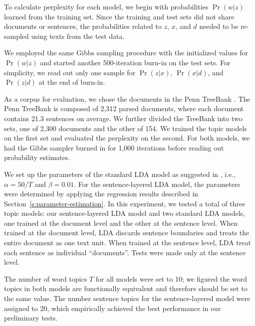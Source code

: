 To calculate perplexity for each model, we begin with probabilities $\Pr(w|z)$
learned from the training set.  Since the training and test sets did not
share documents or sentences, the probabilities related to $z$, $x$,
and $d$ needed to be re-sampled using texts from the test data.  

We employed the same Gibbs sampling procedure with the initialized
values for $\Pr(w|z)$ and started another 500-iteration burn-in on the test
sets.  For simplicity, we read out only one sample for $\Pr(z|x)$,
$\Pr(x|d)$, and $\Pr(z|d)$ at the end of burn-in.

As a corpus for evaluation, we chose the documents in the Penn TreeBank \cite{marcus1994building}.
The Penn TreeBank is composed of 2,312 parsed documents, where each document
contains 21.3 sentences on average.  We further divided the TreeBank into
two sets, one of 2,300 documents and the other of 154.  We trained the topic
models on the first set and evaluated the perplexity on the second.  For both
models, we had the Gibbs sampler burned in for 1,000 iterations before reading
out probability estimates.  

We set up the parameters of the standard LDA model as suggested in
\cite{griffiths2004finding}, i.e., $\alpha = 50 / T$ and $\beta = 0.01$.  For
the sentence-layered LDA model, the parameters were determined by applying the
regression results described in Section~\ref{s:parameter-estimation}.  In this
experiment, we tested a total of three topic models: our sentence-layered LDA model and
two standard LDA models, one trained at the document level and the other at the
sentence level.  When trained at the document level, LDA discards sentence
boundaries and treats the entire document as one text unit.  When trained at
the sentence level, LDA treat each sentence as individual ``documents''.  Tests
were made only at the sentence level.  

The number of word topics $T$ for all models were
set to 10; we figured the word topics in both models are functionally
equivalent and therefore should be set to the same value.  The number
sentence topics for the sentence-layered model were assigned to 
20, which empirically achieved the best performance in our preliminary tests.

